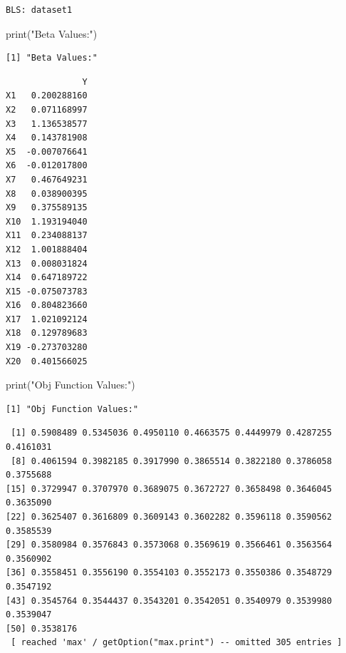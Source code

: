 \documentclass[
  letterpaper,
  DIV=11,
  numbers=noendperiod]{scrartcl}
\newenvironment{Shaded}{\begin{snugshade}}{\end{snugshade}}
\newcommand{\FunctionTok}[1]{\textcolor[rgb]{0.28,0.35,0.67}{#1}}
\newcommand{\NormalTok}[1]{\textcolor[rgb]{0.00,0.23,0.31}{#1}}
\newcommand{\SpecialCharTok}[1]{\textcolor[rgb]{0.37,0.37,0.37}{#1}}
\newcommand{\StringTok}[1]{\textcolor[rgb]{0.13,0.47,0.30}{#1}}
\begin{document}
\begin{verbatim}
BLS: dataset1 
\end{verbatim}

\begin{Shaded}
\begin{Highlighting}[]
\FunctionTok{print}\NormalTok{(}\StringTok{"Beta Values:"}\NormalTok{)}
\end{Highlighting}
\end{Shaded}

\begin{verbatim}
[1] "Beta Values:"
\end{verbatim}

\begin{Shaded}
\end{Shaded}

\begin{verbatim}
               Y
X1   0.200288160
X2   0.071168997
X3   1.136538577
X4   0.143781908
X5  -0.007076641
X6  -0.012017800
X7   0.467649231
X8   0.038900395
X9   0.375589135
X10  1.193194040
X11  0.234088137
X12  1.001888404
X13  0.008031824
X14  0.647189722
X15 -0.075073783
X16  0.804823660
X17  1.021092124
X18  0.129789683
X19 -0.273703280
X20  0.401566025
\end{verbatim}

\begin{Shaded}
\begin{Highlighting}[]
\FunctionTok{print}\NormalTok{(}\StringTok{"Obj Function Values:"}\NormalTok{)}
\end{Highlighting}
\end{Shaded}

\begin{verbatim}
[1] "Obj Function Values:"
\end{verbatim}

\begin{Shaded}
\end{Shaded}

\begin{verbatim}
 [1] 0.5908489 0.5345036 0.4950110 0.4663575 0.4449979 0.4287255 0.4161031
 [8] 0.4061594 0.3982185 0.3917990 0.3865514 0.3822180 0.3786058 0.3755688
[15] 0.3729947 0.3707970 0.3689075 0.3672727 0.3658498 0.3646045 0.3635090
[22] 0.3625407 0.3616809 0.3609143 0.3602282 0.3596118 0.3590562 0.3585539
[29] 0.3580984 0.3576843 0.3573068 0.3569619 0.3566461 0.3563564 0.3560902
[36] 0.3558451 0.3556190 0.3554103 0.3552173 0.3550386 0.3548729 0.3547192
[43] 0.3545764 0.3544437 0.3543201 0.3542051 0.3540979 0.3539980 0.3539047
[50] 0.3538176
 [ reached 'max' / getOption("max.print") -- omitted 305 entries ]
\end{verbatim}
\end{document}
